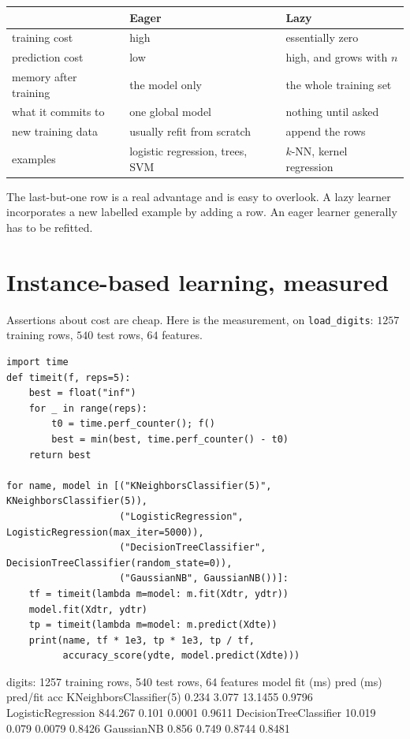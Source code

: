 \documentclass[11pt]{article}
\begin{document}
\begin{center}\small
\begin{tabular}{@{}lll@{}}
\toprule
 & \textbf{Eager} & \textbf{Lazy}\\
\midrule
training cost & high & essentially zero\\
prediction cost & low & high, and grows with $n$\\
memory after training & the model only & the whole training set\\
what it commits to & one global model & nothing until asked\\
new training data & usually refit from scratch & append the rows\\
examples & logistic regression, trees, SVM & $k$-NN, kernel regression\\
\bottomrule
\end{tabular}
\end{center}

The last-but-one row is a real advantage and is easy to overlook. A lazy
learner incorporates a new labelled example by adding a row. An eager learner
generally has to be refitted.

\section{Instance-based learning, measured}
\label{sec:lazy}

Assertions about cost are cheap. Here is the measurement, on
\texttt{load\_digits}: $1257$ training rows, $540$ test rows, $64$ features.

\begin{lstlisting}
import time
def timeit(f, reps=5):
    best = float("inf")
    for _ in range(reps):
        t0 = time.perf_counter(); f()
        best = min(best, time.perf_counter() - t0)
    return best

for name, model in [("KNeighborsClassifier(5)", KNeighborsClassifier(5)),
                    ("LogisticRegression", LogisticRegression(max_iter=5000)),
                    ("DecisionTreeClassifier", DecisionTreeClassifier(random_state=0)),
                    ("GaussianNB", GaussianNB())]:
    tf = timeit(lambda m=model: m.fit(Xdtr, ydtr))
    model.fit(Xdtr, ydtr)
    tp = timeit(lambda m=model: m.predict(Xdte))
    print(name, tf * 1e3, tp * 1e3, tp / tf,
          accuracy_score(ydte, model.predict(Xdte)))
\end{lstlisting}
\begin{codeout}
digits: 1257 training rows, 540 test rows, 64 features
model                      fit (ms)   pred (ms)   pred/fit      acc
KNeighborsClassifier(5)       0.234       3.077    13.1455   0.9796
LogisticRegression          844.267       0.101     0.0001   0.9611
DecisionTreeClassifier       10.019       0.079     0.0079   0.8426
GaussianNB                    0.856       0.749     0.8744   0.8481
\end{codeout}
\end{document}
